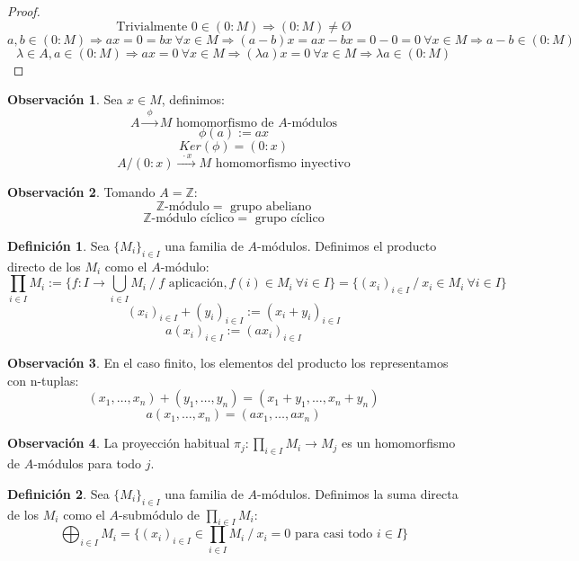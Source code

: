 \documentclass{article}
\theoremstyle{theorem-style}  %
\theoremstyle{definition}
\newtheorem{definition}{Definición}[section]
\newtheorem*{observation}{Observación} %
\theoremstyle{example-style}
\begin{document}
	\begin{proof}
		\[ \text{Trivialmente } 0 \in (0:M) \Rightarrow (0:M) \neq \text{\O}\]
		\[ a,b \in (0:M) \Rightarrow ax=0=bx \ \forall x \in M \Rightarrow (a-b)x=ax-bx=0-0=0 \ \forall x \in M \Rightarrow a-b \in (0:M) \]
		\[ \lambda \in A, a \in (0:M) \Rightarrow ax=0 \ \forall x \in M \Rightarrow (\lambda a)x=0 \ \forall x \in M \Rightarrow \lambda a \in (0:M) \]
	\end{proof}

	\begin{observation}
		Sea $x \in M$, definimos:
		\[ A\xrightarrow{\ \ \phi \ \ } M \text{ homomorfismo de $A$-módulos}\]
		\[ \phi(a):=ax\]
		\[ Ker(\phi)=(0:x)\]
		\[A/(0:x)\xrightarrow{\ \ \cdot x\ \ }M \text{ homomorfismo inyectivo}\]
	\end{observation}

	\begin{observation}
		Tomando $A=\mathbb{Z}$:
		\[ \mathbb{Z}\text{-módulo}=\text{ grupo abeliano}\]
		\[ \mathbb{Z}\text{-módulo cíclico}=\text{ grupo cíclico}\]
	\end{observation}

	\begin{definition}
		Sea $\{M_i\}_{i\in I}$ una familia de $A$-módulos. Definimos el producto directo de los $M_i$ como el $A$-módulo:
		\[ \prod_{i\in I}M_i := \{f:I\rightarrow\bigcup_{i\in I}M_i \ / \ \text{$f$ aplicación}, f(i)\in M_i \ \forall i \in I\} = \{(x_i)_{i\in I} \ / \ x_i \in M_i \ \forall i \in I\}\]
		\[(x_i)_{i\in I} + (y_i)_{i\in I} := (x_i + y_i)_{i\in I}\]
		\[a(x_i)_{i\in I} := (ax_i)_{i\in I}\]
	\end{definition}

	\begin{observation}
		En el caso finito, los elementos del producto los representamos con n-tuplas:
		\[(x_1,\dots,x_n)+(y_1,\dots,y_n)=(x_1+y_1,\dots,x_n+y_n)\]
		\[a(x_1,\dots,x_n)=(ax_1,\dots,ax_n)\]
	\end{observation}

	\begin{observation}
		La proyección habitual $\pi_j:\prod_{i\in I}M_i \longrightarrow M_j$ es un homomorfismo de $A$-módulos para todo $j$.
	\end{observation}

	\begin{definition}
		Sea $\{M_i\}_{i\in I}$ una familia de $A$-módulos. Definimos la suma directa de los $M_i$ como el $A$-submódulo de $\prod_{i\in I}M_i$:
		\[\bigoplus_{i\in I}M_i=\{(x_i)_{i\in I} \in \prod_{i\in I}M_i \ / \ x_i=0 \text{ para casi todo } i \in I\}\]
	\end{definition}
\end{document}

